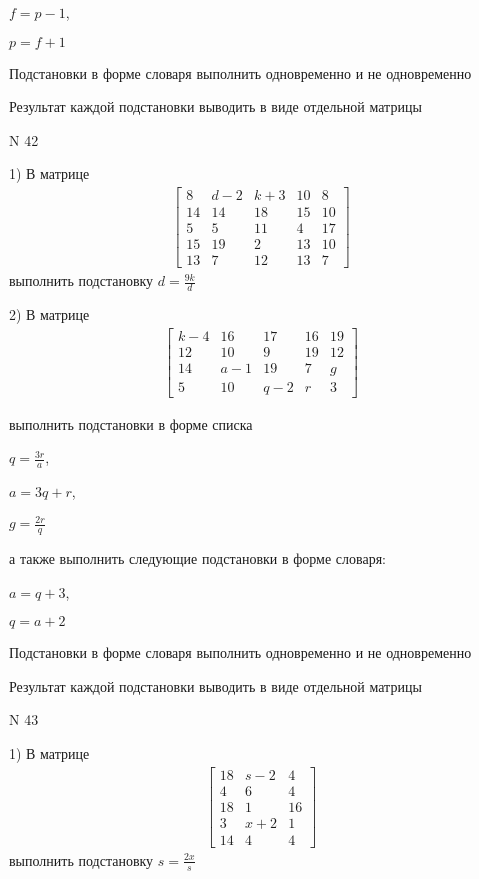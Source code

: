 \documentclass[11pt]{report}
\begin{document}
$f=p - 1$,

$p=f + 1$


    Подстановки в форме словаря выполнить одновременно и не одновременно


    Результат каждой подстановки выводить в виде отдельной матрицы

\newpage
N 42


    1) В матрице
\begin{align*}
\left[\begin{matrix}8 & d - 2 & k + 3 & 10 & 8\\14 & 14 & 18 & 15 & 10\\5 & 5 & 11 & 4 & 17\\15 & 19 & 2 & 13 & 10\\13 & 7 & 12 & 13 & 7\end{matrix}\right]
\end{align*}
выполнить подстановку $d=\frac{9 k}{d}$


    2) В матрице
\begin{align*}
\left[\begin{matrix}k - 4 & 16 & 17 & 16 & 19\\12 & 10 & 9 & 19 & 12\\14 & a - 1 & 19 & 7 & g\\5 & 10 & q - 2 & r & 3\end{matrix}\right]
\end{align*}

выполнить подстановки в форме списка

$q=\frac{3 r}{a}$,

$a=3 q + r$,

$g=\frac{2 r}{q}$

а также выполнить следующие подстановки в форме словаря:

$a=q + 3$,

$q=a + 2$


    Подстановки в форме словаря выполнить одновременно и не одновременно


    Результат каждой подстановки выводить в виде отдельной матрицы

\newpage
N 43


    1) В матрице
\begin{align*}
\left[\begin{matrix}18 & s - 2 & 4\\4 & 6 & 4\\18 & 1 & 16\\3 & x + 2 & 1\\14 & 4 & 4\end{matrix}\right]
\end{align*}
выполнить подстановку $s=\frac{2 x}{s}$
\end{document}
